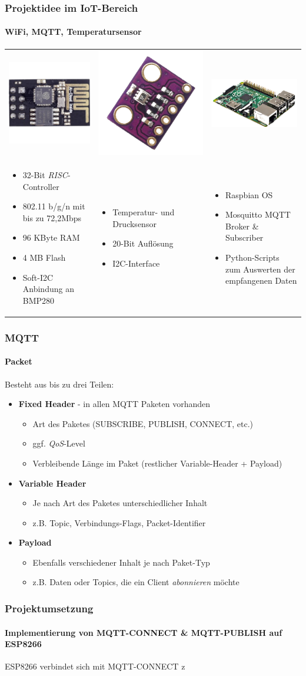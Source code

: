 \documentclass{beamer}
\begin{document}
\begin{frame}

\frametitle{Projektidee im IoT-Bereich}
\framesubtitle{WiFi, MQTT, Temperatursensor}
\begin{tabularx}{\textwidth}{XXX}
	\includegraphics[scale=0.1]{images/esp8266.jpg} & \includegraphics[scale=0.05]{images/bmp280.png} & \includegraphics[scale=0.15]{images/raspi.png} \\
	\begin{itemize}
		\item 32-Bit \textit{RISC}- Controller
		\item 802.11 b/g/n mit bis zu 72,2Mbps
		\item 96 KByte RAM
		\item 4 MB Flash
		\item Soft-I2C Anbindung an BMP280
	\end{itemize} & \begin{itemize}
		\item Temperatur- und Drucksensor
		\item 20-Bit Auflösung
		\item I2C-Interface
	\end{itemize} & \begin{itemize}
		\item Raspbian OS
		\item Mosquitto MQTT Broker \& Subscriber
		\item Python-Scripts zum Auswerten der empfangenen Daten
	\end{itemize}
\end{tabularx}

\end{frame}

\begin{frame}

\frametitle{MQTT}
\framesubtitle{Packet}
Besteht aus bis zu drei Teilen:	
\begin{itemize}
	\item \textbf{Fixed Header} - in allen MQTT Paketen vorhanden
	\begin{itemize}
		\item Art des Paketes (SUBSCRIBE, PUBLISH, CONNECT, etc.)
		\item ggf. \textit{QoS}-Level
		\item Verbleibende Länge im Paket (restlicher Variable-Header + Payload)
	\end{itemize}
	\item \textbf{Variable Header}
	\begin{itemize}
		\item Je nach Art des Paketes unterschiedlicher Inhalt
		\item z.B. Topic, Verbindungs-Flags, Packet-Identifier
	\end{itemize}
	\item \textbf{Payload}
	\begin{itemize}
		\item Ebenfalls verschiedener Inhalt je nach Paket-Typ
		\item z.B. Daten oder Topics, die ein Client \textit{abonnieren} möchte
	\end{itemize}
\end{itemize}

\end{frame}

\begin{frame}

\frametitle{Projektumsetzung}
\framesubtitle{Implementierung von MQTT-CONNECT \& MQTT-PUBLISH auf ESP8266}
ESP8266 verbindet sich mit MQTT-CONNECT z
\end{frame}
\end{document}
